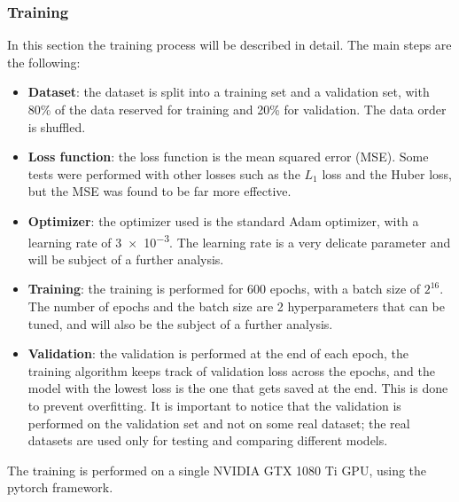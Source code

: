 \documentclass[a4paper,12pt,sort&compress]{article}
\begin{document}
\subsubsection*{Training}
    In this section the training process will be described in detail. The main steps are the
    following:
    \begin{itemize}
        \item \textbf{Dataset}: the dataset is split into a training set and a validation set, with
        80\% of the data reserved for training and 20\% for validation. The data order is shuffled.
        \item \textbf{Loss function}: the loss function is the mean squared error (MSE). Some tests
        were performed with other losses such as the $L_1$ loss and the Huber loss, but the MSE was
        found to be far more effective.
        \item \textbf{Optimizer}: the optimizer used is the standard Adam optimizer, with a learning
        rate of \num{3e-3}. The learning rate is a very delicate parameter and will be subject of a
        further analysis.
        \item \textbf{Training}: the training is performed for 600 epochs, with a batch size of
        $2^{16}$. The number of epochs and the batch size are 2 hyperparameters that can be tuned, and will also be the
        subject of a further analysis. 
        \item \textbf{Validation}: the validation is performed at the end of each epoch, the
        training algorithm keeps track of validation loss across the epochs, and the model with the
        lowest loss is the one that gets saved at the end. This is done to prevent overfitting. It
        is important to notice that the validation is performed on the validation set and not on
        some real dataset; the real datasets are used only for testing and comparing different models.
    \end{itemize}

    The training is performed on a single NVIDIA GTX 1080 Ti GPU, using the pytorch framework.
\end{document}
